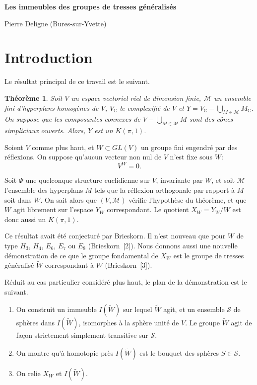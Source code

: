 \documentclass[12pt]{article}
\newtheorem{theoreme}{Théorème}
\theoremstyle{remark}
\newcommand{\CC}{\mathbb{C}}
\begin{document}
\begin{center}
\textbf{\Large Les immeubles des groupes de tresses généralisés}

\medskip
{\large Pierre Deligne (Bures-sur-Yvette)}
\end{center}

\section*{Introduction}

Le résultat principal de ce travail est le suivant.

\begin{theoreme}
Soit $V$ un espace vectoriel réel de dimension finie, $\mathcal{M}$ un ensemble fini d'hyperplans homogènes de $V$, $V_{\CC}$ le complexifié de $V$ et $Y = V_{\CC} - \bigcup_{M \in \mathcal{M}} M_{\CC}$. On suppose que les composantes connexes de $V - \bigcup_{M \in \mathcal{M}} M$ sont des cônes simpliciaux ouverts. Alors, $Y$ est un $K(\pi, 1)$.
\end{theoreme}

Soient $V$ comme plus haut, et $W \subset GL(V)$ un groupe fini engendré par des réflexions. On suppose qu'aucun vecteur non nul de $V$ n'est fixe sous $W$:
\[V^W = 0.\]

Soit $\Phi$ une quelconque structure euclidienne sur $V$, invariante par $W$, et soit $\mathcal{M}$ l'ensemble des hyperplans $M$ tels que la réflexion orthogonale par rapport à $M$ soit dans $W$. On sait alors que $(V, \mathcal{M})$ vérifie l'hypothèse du théorème, et que $W$ agit librement sur l'espace $Y_W$ correspondant. Le quotient $X_W = Y_W/W$ est donc aussi un $K(\pi, 1)$.

Ce résultat avait été conjecturé par Brieskorn. Il n'est nouveau que pour $W$ de type $H_3$, $H_4$, $E_6$, $E_7$ ou $E_8$ (Brieskorn~[2]). Nous donnons aussi une nouvelle démonstration de ce que le groupe fondamental de $X_W$ est le groupe de tresses généralisé $\tilde{W}$ correspondant à $W$ (Brieskorn~[3]).

Réduit au cas particulier considéré plus haut, le plan de la démonstration est le suivant.

\begin{enumerate}
\item[a)] On construit un immeuble $I(\tilde{W})$ sur lequel $\tilde{W}$ agit, et un ensemble $\mathscr{S}$ de sphères dans $I(\tilde{W})$, isomorphes à la sphère unité de $V$. Le groupe $\tilde{W}$ agit de façon strictement simplement transitive sur $\mathscr{S}$.
\item[b)] On montre qu'à homotopie près $I(\tilde{W})$ est le bouquet des sphères $S \in \mathscr{S}$.
\item[c)] On relie $X_W$ et $I(\tilde{W})$.
\end{enumerate}
\end{document}
